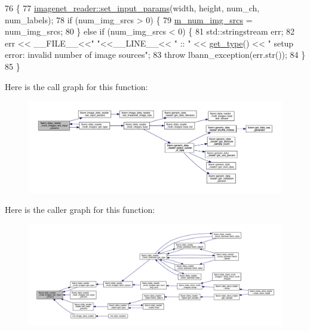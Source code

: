 \begin{DoxyCode}
76                                                                                                            
                                            \{
77   \hyperlink{classlbann_1_1image__data__reader_a6ed9b8b12ad3ffa93ad458d872f8c044}{imagenet\_reader::set\_input\_params}(width, height, num\_ch, num\_labels);
78   \textcolor{keywordflow}{if} (num\_img\_srcs > 0) \{
79     \hyperlink{classlbann_1_1data__reader__multi__images_a70752a5442e99333fec52def9eadc58f}{m\_num\_img\_srcs} = num\_img\_srcs;
80   \} \textcolor{keywordflow}{else} \textcolor{keywordflow}{if} (num\_img\_srcs < 0) \{
81     std::stringstream err;
82     err << \_\_FILE\_\_<<\textcolor{stringliteral}{" "}<<\_\_LINE\_\_<< \textcolor{stringliteral}{" :: "} << \hyperlink{classlbann_1_1data__reader__multi__images_a9939a88a40caf7b2a27de08deca54ac1}{get\_type}() << \textcolor{stringliteral}{" setup error: invalid number of image
       sources"};
83     \textcolor{keywordflow}{throw} lbann\_exception(err.str());
84   \}
85 \}
\end{DoxyCode}
Here is the call graph for this function\+:\nopagebreak
\begin{figure}[H]
\begin{center}
\leavevmode
\includegraphics[width=350pt]{classlbann_1_1data__reader__multi__images_a57824ec9de5c1131b2f15a0cb3d4ab75_cgraph}
\end{center}
\end{figure}
Here is the caller graph for this function\+:\nopagebreak
\begin{figure}[H]
\begin{center}
\leavevmode
\includegraphics[width=350pt]{classlbann_1_1data__reader__multi__images_a57824ec9de5c1131b2f15a0cb3d4ab75_icgraph}
\end{center}
\end{figure}
\mbox{\label{classlbann_1_1data__reader__multi__images_afdb403556ed04a9142932e89ac60435e}} 
